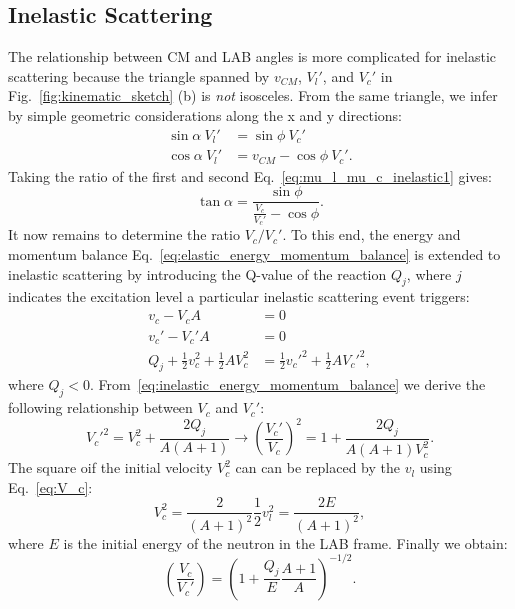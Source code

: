 \documentclass[review]{elsarticle}
\begin{document}
\subsection{Inelastic Scattering}
The relationship between CM and LAB angles is more complicated for inelastic scattering because the triangle spanned by $v_{CM}$, $V_l'$, and $V_c'$ in Fig.~\ref{fig:kinematic_sketch} (b) is \textit{not}
isosceles. From the same triangle, we infer by simple geometric considerations along the x and y directions:
\begin{align}\label{eq:mu_l_mu_c_inelastic1}
  \sin \alpha ~V_l' &= \sin \phi ~V_c' \nonumber\\
 \cos \alpha ~V_l'  &= v_{CM} - \cos \phi ~V_c'.
 \end{align} 
Taking the ratio of the first and second Eq.~\ref{eq:mu_l_mu_c_inelastic1} gives:
\begin{equation}\label{eq:mu_l_mu_c_inelastic2}
  \tan \alpha = \frac{\sin \phi }{\frac{V_c}{V_c'} - \cos \phi} .
 \end{equation}
It now remains to determine the ratio $V_c / V_c'$. To this end, the energy and momentum balance Eq.~\ref{eq:elastic_energy_momentum_balance} is extended to inelastic scattering by introducing the
Q-value of the reaction $Q_j$, where $j$ indicates the excitation level a particular inelastic scattering event triggers:
\begin{align} \label{eq:inelastic_energy_momentum_balance}
  v_c - V_c A  &= 0 \nonumber \\
  v_c' - V_c' A &= 0 \nonumber \\
 Q_j +  \frac{1}{2} v_c^2 + \frac{1}{2} A V_c^2 &= \frac{1}{2} v_c'^2 + \frac{1}{2} A V_c'^2,
\end{align}
where $Q_j < 0$.
From~\ref{eq:inelastic_energy_momentum_balance} we derive the following relationship between $V_c$ and $V_c'$:
\begin{equation}\label{eq:V_c_inelastic_pre}
  V_c'^2 = V_c^2 + \frac{2 Q_j}{A(A+1)} \rightarrow \left( \frac{V_c'}{V_c} \right)^2 = 1 + \frac{2 Q_j}{A(A+1) V_c^2}.
\end{equation}
The square oif the initial velocity $V_c^2$ can can be replaced by the $v_l$ using Eq.~\ref{eq:V_c}:
\begin{equation}
  V_c^2 = \frac{2}{(A+1)^2} \frac{1}{2} v_l^2 =  \frac{2E}{(A+1)^2},
\end{equation}
where $E$ is the initial energy of the neutron in the LAB frame. Finally we obtain:
\begin{equation}\label{eq:V_c_inelastic}
   \left( \frac{V_c}{V_c'} \right) = \left(1 + \frac{ Q_j}{E}  \frac{A+1}{A} \right)^{-1/2}.
\end{equation}
\end{document}
